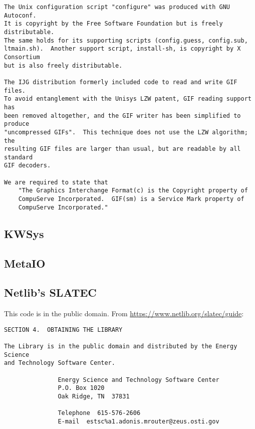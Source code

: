 \begin{verbatim}
The Unix configuration script "configure" was produced with GNU Autoconf.
It is copyright by the Free Software Foundation but is freely distributable.
The same holds for its supporting scripts (config.guess, config.sub,
ltmain.sh).  Another support script, install-sh, is copyright by X Consortium
but is also freely distributable.

The IJG distribution formerly included code to read and write GIF files.
To avoid entanglement with the Unisys LZW patent, GIF reading support has
been removed altogether, and the GIF writer has been simplified to produce
"uncompressed GIFs".  This technique does not use the LZW algorithm; the
resulting GIF files are larger than usual, but are readable by all standard
GIF decoders.

We are required to state that
    "The Graphics Interchange Format(c) is the Copyright property of
    CompuServe Incorporated.  GIF(sm) is a Service Mark property of
    CompuServe Incorporated."
\end{verbatim}

\subsection{KWSys}


\subsection{MetaIO}


\subsection{Netlib's SLATEC}
This code is in the public domain.  From
\url{https://www.netlib.org/slatec/guide}:
\begin{verbatim}
SECTION 4.  OBTAINING THE LIBRARY

The Library is in the public domain and distributed by the Energy Science
and Technology Software Center.

               Energy Science and Technology Software Center
               P.O. Box 1020
               Oak Ridge, TN  37831

               Telephone  615-576-2606
               E-mail  estsc%a1.adonis.mrouter@zeus.osti.gov
\end{verbatim}

